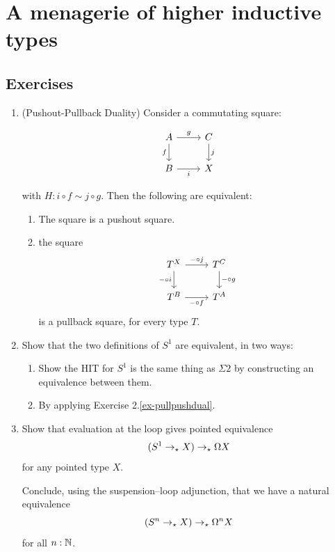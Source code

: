 \documentclass[10pt,oneside,leqno,openright]{memoir}
\begin{document}
\chapter{A menagerie of higher inductive types}


\section{Exercises}
\begin{enumerate} 
\item \label{ex-pullpushdual} (Pushout-Pullback Duality) Consider a commutating square:

\[
    \begin{tikzcd}
      A \ar[d,"f"']\ar[r,"g"] & C\ar[d,"{j}"] \\
      B\ar[r,"{i}"'] & X
    \end{tikzcd}
  \]

with $H : i \circ f \sim j \circ g$. Then the following are equivalent:
\begin{enumerate}[label=(\roman*)]
    \item The square is a pushout square.
    \item the square
    \[
    \begin{tikzcd}
      T^X \ar[d,"- \circ i"']\ar[r,"- \circ j"] & T^C\ar[d,"- \circ g"] \\
      T^B\ar[r,"- \circ f"'] & T^A
    \end{tikzcd}
  \]
is a pullback square, for every type $T$.
\end{enumerate}
\item Show that the two definitions of $S^1$ are equivalent, in two ways:
\begin{enumerate}[label=(\roman*)]
    \item Show the
  HIT for $S^1$ is the same thing as $\Sigma 2$ by constructing an equivalence between them.
  \item  By applying Exercise 2.\ref{ex-pullpushdual}.
\end{enumerate}


\item Show that evaluation at the loop gives pointed equivalence
  \[
    (S^1 \to_\star X) \to_\star \Omega X
  \]
  for any pointed type $X$.

  Conclude, using the suspension--loop adjunction, that we have a natural equivalence
  \[
    (S^n \to_\star X) \to_\star \Omega^n X
  \]
  for all $n:\mathbb{N}$.


\end{enumerate}
\end{document}
